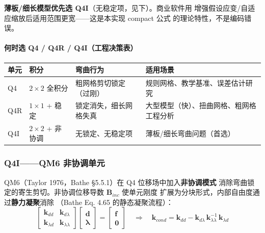 \documentclass[12pt,a4paper]{ctexart}
\begin{document}
\textbf{薄板/细长模型优先选 Q4I}（无稳定项，见下）。商业软件用
增强假设应变/自适应缩放后适用范围更宽——这是本实现 compact 公式
的理论特性，不是编码错误。

\paragraph{何时选 Q4 / Q4R / Q4I（工程决策表）}

\begin{table}[h]
\centering
\small
\begin{tabular}{p{2.4cm}p{3.4cm}p{3.4cm}p{5.0cm}}
\toprule
\textbf{单元} & \textbf{积分} & \textbf{弯曲行为} & \textbf{适用场景} \\
\midrule
Q4 & $2\times2$ 全积分 & 粗网格剪切锁定（过刚） & 规则网格、教学基准、误差估计研究 \\
Q4R & $1\times1$ + 稳定 & 锁定消失，细长网格失真 & 大型模型（快）、扭曲网格、粗网格工程分析 \\
Q4I & $2\times2$ + 非协调 & 无锁定、无稳定项 & 薄板/细长弯曲问题（首选） \\
\bottomrule
\end{tabular}
\end{table}

\subsubsection{Q4I——QM6 非协调单元}

QM6（Taylor 1976，Bathe §5.5.1）在 Q4 位移场中加入\textbf{非协调模式}
消除弯曲锁定的寄生剪切。非协调位移导数 $\mathbf{B}_{inc}$ 使单元刚度
扩展为分块形式，内部自由度通过\textbf{静力凝聚}消除
（Bathe Eq. 4.65 的静态凝聚流程）：
\begin{equation}
\begin{bmatrix} \mathbf{k}_{dd} & \mathbf{k}_{d\lambda} \\ \mathbf{k}_{\lambda d} & \mathbf{k}_{\lambda\lambda} \end{bmatrix}
\begin{bmatrix} \mathbf{d} \\ \boldsymbol{\lambda} \end{bmatrix}
= \begin{bmatrix} \mathbf{f} \\ \mathbf{0} \end{bmatrix}
\quad\Longrightarrow\quad
\mathbf{k}_{cond} = \mathbf{k}_{dd} - \mathbf{k}_{d\lambda}\,\mathbf{k}_{\lambda\lambda}^{-1}\,\mathbf{k}_{\lambda d}
\end{equation}
\end{document}

